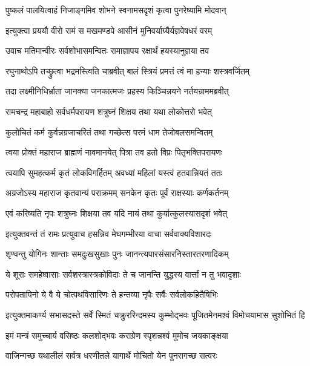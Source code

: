 \twolineshloka
{पुष्कलं पालयित्वाहं निजाङ्गमिव शोभने}
{स्वनामसदृशं कृत्वा पुनरेष्यामि मोदवान्}%

\twolineshloka
{इत्युक्त्वा प्रययौ वीरो रामं स मखमण्डपे}
{आसीनं मुनिवर्याग्र्यैर्यज्ञवेषधरं वरम्}%

\twolineshloka
{उवाच मतिमान्वीरः सर्वशोभासमन्वितः}
{रामाज्ञापय रक्षार्थं हयस्यानुज्ञया तव}%

\twolineshloka
{रघुनाथोऽपि तच्छ्रुत्वा भद्रमस्त्विति चाब्रवीत्}
{बालं स्त्रियं प्रमत्तं त्वं मा हन्याः शस्त्रवर्जितम्}%

\twolineshloka
{तदा लक्ष्मीनिधिर्भ्राता जानक्या जनकात्मजः}
{प्रहस्य किञ्चिन्नयने नर्तयन्राममब्रवीत्}%


\twolineshloka
{रामचन्द्र महाबाहो सर्वधर्मपरायण}
{शत्रुघ्नं शिक्षय तथा यथा लोकोत्तरो भवेत्}%

\twolineshloka
{कुलोचितं कर्म कुर्वन्नग्रजाचरितं तथा}
{गच्छेत्स परमं धाम तेजोबलसमन्वितम्}%

\twolineshloka
{त्वया प्रोक्तं महाराज ब्राह्मणं नावमानयेत्}
{पित्रा तव हतो विप्रः पितृभक्तिपरायणः}%

\twolineshloka
{त्वयापि सुमहत्कर्म कृतं लोकविगर्हितम्}
{अवध्यां महिलां यस्त्वं हतवान्नियतं ततः}%

\twolineshloka
{अग्रजोऽस्य महाराज कृतवान्यं पराक्रमम्}
{सनकेन कृतः पूर्वं राक्षस्याः कर्णकर्तनम्}%

\twolineshloka
{एवं करिष्यति नृपः शत्रुघ्नः शिक्षया तव}
{यदि नायं तथा कुर्यात्कुलस्यासदृशं भवेत्}%

\twolineshloka
{इत्युक्तवन्तं तं रामः प्रत्युवाच हसन्निव}
{मेघगम्भीरया वाचा सर्ववाक्यविशारदः}%

\twolineshloka
{शृण्वन्तु योगिनः शान्ताः समदुःखसुखाः पुनः}
{जानन्त्यपारसंसारनिस्तारतरणादिकम्}%

\twolineshloka
{ये शूराः समहेष्वासाः सर्वशस्त्रास्त्रकोविदाः}
{ते च जानन्ति युद्धस्य वार्त्तां न तु भवादृशाः}%

\twolineshloka
{परोपतापिनो ये वै ये चोत्पथविसारिणः}
{ते हन्तव्या नृपैः सर्वैः सर्वलोकहितैषिभिः}%

\twolineshloka
{इत्युक्तमाकर्ण्य सभासदस्ते सर्वे स्मितं चक्रुररिन्दमस्य}
{कुम्भोद्भवः पूजितमेनमश्वं विमोचयामास सुशोभितं हि}%

\twolineshloka
{इमं मन्त्रं समुच्चार्य वसिष्ठः कलशोद्भवः}
{कराग्रेण स्पृशन्नश्वं मुमोच जयकाङ्क्षया}%

\twolineshloka
{वाजिन्गच्छ यथालीलं सर्वत्र धरणीतले}
{यागार्थे मोचितो येन पुनरागच्छ सत्वरः}%

